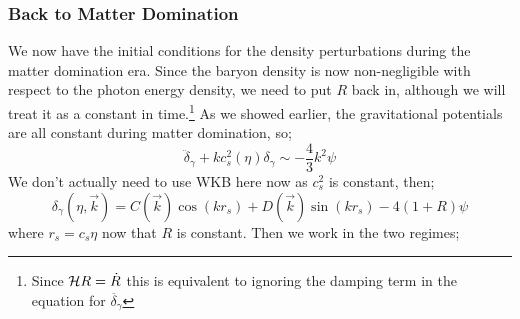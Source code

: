 \subsubsection*{Back to Matter Domination}
We now have the initial conditions for the density perturbations during the matter domination era. Since the baryon density is now non-negligible with respect to the photon energy density, we need to put $R$ back in, although we will treat it as a constant in time.\footnote{Since $\mathcal{H} R = \dot{R}$ this is equivalent to ignoring the damping term in the equation for $\ddot{\delta_\gamma}$} As we showed earlier, the gravitational potentials are all constant during matter domination, so;
\begin{equation*}
\ddot{\delta}_\gamma + kc_s^{2}(\eta)\delta_\gamma \sim -\frac{4}{3}k^2 \psi
\end{equation*}
We don't actually need to use WKB here now as $c_s^{2}$ is constant, then;
\begin{equation*}
\delta_\gamma(\eta, \vec{k}) = C(\vec{k})\cos(kr_s) + D(\vec{k})\sin(kr_s) - 4(1 + R)\psi
\end{equation*}
where $r_s = c_s \eta$ now that $R$ is constant. Then we work in the two regimes;
